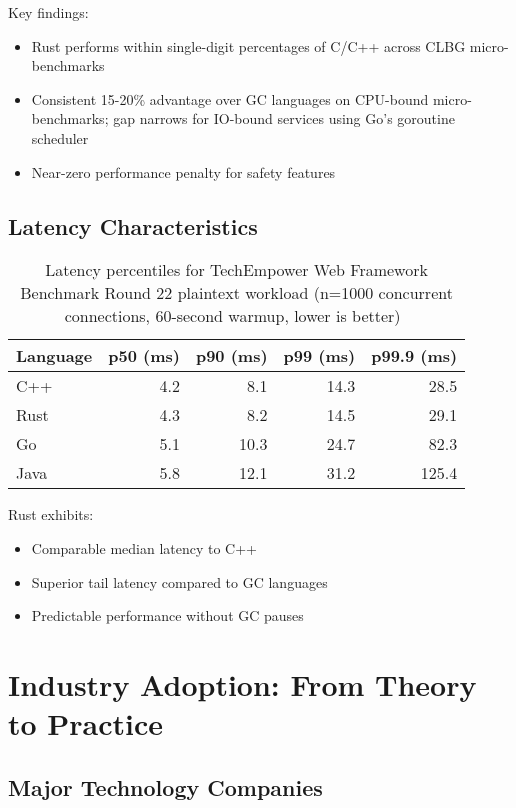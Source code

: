 \documentclass[11pt]{article}
\begin{document}
Key findings:
\begin{itemize}
    \item Rust performs within single-digit percentages of C/C++ across CLBG micro-benchmarks
    \item Consistent 15-20\% advantage over GC languages on CPU-bound micro-benchmarks; gap narrows for IO-bound services using Go's goroutine scheduler
    \item Near-zero performance penalty for safety features
\end{itemize}

\subsection{Latency Characteristics}

\begin{table}[h]
\centering
\begin{tabular}{@{}lrrrr@{}}
\toprule
\textbf{Language} & \textbf{p50 (ms)} & \textbf{p90 (ms)} & \textbf{p99 (ms)} & \textbf{p99.9 (ms)} \\
\midrule
C++ & 4.2 & 8.1 & 14.3 & 28.5 \\
Rust & 4.3 & 8.2 & 14.5 & 29.1 \\
Go & 5.1 & 10.3 & 24.7 & 82.3 \\
Java & 5.8 & 12.1 & 31.2 & 125.4 \\
\bottomrule
\end{tabular}
\caption{Latency percentiles for TechEmpower Web Framework Benchmark Round 22 plaintext workload (n=1000 concurrent connections, 60-second warmup, lower is better)~\cite{techempower2023}}
\label{tab:latency}
\end{table}

Rust exhibits:
\begin{itemize}
    \item Comparable median latency to C++
    \item Superior tail latency compared to GC languages
    \item Predictable performance without GC pauses
\end{itemize}

\section{Industry Adoption: From Theory to Practice}

\subsection{Major Technology Companies}
\end{document}
